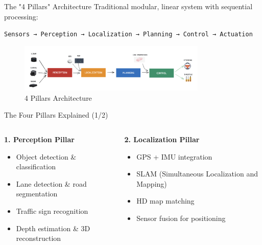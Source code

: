 \documentclass[aspectratio=169]{beamer}
\begin{document}
\begin{frame}{The "4 Pillars" Architecture}
    Traditional modular, linear system with sequential processing:
    
    \vspace{0.5cm}
    \begin{center}
        \texttt{Sensors → Perception → Localization → Planning → Control → Actuation}
    \end{center}
    
    \vspace{0.5cm}
    \begin{figure}
        \centering
        \includegraphics[width=0.8\textwidth]{docs/figures/autonomous4pillars.png}
        \caption{4 Pillars Architecture}
    \end{figure}
\end{frame}

\begin{frame}{The Four Pillars Explained (1/2)}
    \begin{columns}
        \begin{column}{0.5\textwidth}
            \textbf{1. Perception Pillar}
            \begin{itemize}
                \item Object detection \& classification
                \item Lane detection \& road segmentation
                \item Traffic sign recognition
                \item Depth estimation \& 3D reconstruction
            \end{itemize}
        \end{column}
        \begin{column}{0.5\textwidth}
            \textbf{2. Localization Pillar}
            \begin{itemize}
                \item GPS + IMU integration
                \item SLAM (Simultaneous Localization and Mapping)
                \item HD map matching
                \item Sensor fusion for positioning
            \end{itemize}
        \end{column}
    \end{columns}
\end{frame}
\end{document}
